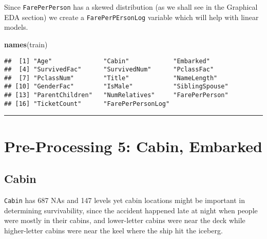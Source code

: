 \documentclass[]{article}
\newenvironment{Shaded}{\begin{snugshade}}{\end{snugshade}}
\newcommand{\KeywordTok}[1]{\textcolor[rgb]{0.13,0.29,0.53}{\textbf{#1}}}
\newcommand{\DecValTok}[1]{\textcolor[rgb]{0.00,0.00,0.81}{#1}}
\newcommand{\StringTok}[1]{\textcolor[rgb]{0.31,0.60,0.02}{#1}}
\newcommand{\CommentTok}[1]{\textcolor[rgb]{0.56,0.35,0.01}{\textit{#1}}}
\newcommand{\OperatorTok}[1]{\textcolor[rgb]{0.81,0.36,0.00}{\textbf{#1}}}
\newcommand{\NormalTok}[1]{#1}
\begin{document}
Since \texttt{FarePerPerson} has a skewed distribution (as we shall see
in the Graphical EDA section) we create a \texttt{FarePerPErsonLog}
variable which will help with linear models.

\begin{Shaded}
\end{Shaded}

\begin{Shaded}
\begin{Highlighting}[]
\KeywordTok{names}\NormalTok{(train)}
\end{Highlighting}
\end{Shaded}

\begin{verbatim}
##  [1] "Age"              "Cabin"            "Embarked"        
##  [4] "SurvivedFac"      "SurvivedNum"      "PclassFac"       
##  [7] "PclassNum"        "Title"            "NameLength"      
## [10] "GenderFac"        "IsMale"           "SiblingSpouse"   
## [13] "ParentChildren"   "NumRelatives"     "FarePerPerson"   
## [16] "TicketCount"      "FarePerPersonLog"
\end{verbatim}

\begin{center}\rule{0.5\linewidth}{\linethickness}\end{center}

\hypertarget{preprocess5-link}{\section{Pre-Processing 5: Cabin,
Embarked}\label{preprocess5-link}}

\subsection{Cabin}\label{cabin}

\texttt{Cabin} has 687 NAs and 147 levels yet cabin locations might be
important in determining survivability, since the accident happened late
at night when people were mostly in their cabins, and lower-letter
cabins were near the deck while higher-letter cabins were near the keel
where the ship hit the iceberg.
\end{document}
